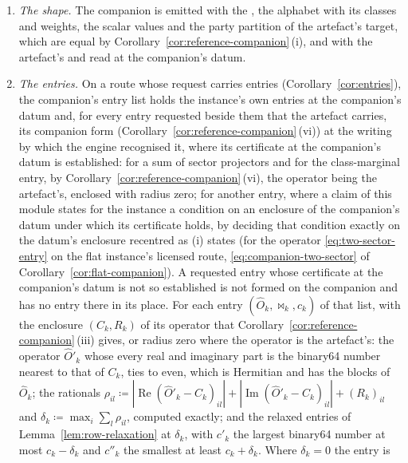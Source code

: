 \begin{requirement}
\begin{enumerate}[label=(\roman*),leftmargin=2.4em]
  emits the centres, entries of $\mathbb{Q}(i)$, and the radii, rationals,
  entry by entry, so that an entry the reference knows exactly is emitted
  exactly, with radius zero.
\item \emph{The shape.} The companion is emitted with the , the
  alphabet with its classes and weights, the scalar values and the party
  partition of the artefact's target, which are equal by
  Corollary~\ref{cor:reference-companion}\,(i), and with the artefact's
   and  read at the companion's datum.
\item \emph{The entries.} On a route whose request carries entries
  (Corollary~\ref{cor:entries}), the companion's entry list holds the
  instance's own entries at the companion's datum and, for every entry
  requested beside them that the artefact carries, its companion form
  (Corollary~\ref{cor:reference-companion}\,(vi)) at the writing by which
  the engine recognised it, where its certificate at the companion's datum
  is established: for a sum of sector projectors and for the class-marginal
  entry, by Corollary~\ref{cor:reference-companion}\,(vi), the operator
  being the artefact's, enclosed with radius zero; for another entry, where
  a claim of this module states for the instance a condition on an
  enclosure of the companion's datum under which its certificate holds,
  by deciding that condition exactly on the datum's enclosure recentred as
  (i) states (for the operator \eqref{eq:two-sector-entry} on the flat instance's
  licensed route, \eqref{eq:companion-two-sector} of
  Corollary~\ref{cor:flat-companion}). A requested entry whose certificate
  at the companion's datum is not so established is not formed on the
  companion and has no entry there in its place. For each entry
  $(\hat O_k,\bowtie_k,c_k)$ of that list, with the enclosure $(C_k,R_k)$
  of its operator that Corollary~\ref{cor:reference-companion}\,(iii)
  gives, or radius zero where the operator is the artefact's: the operator
  $\hat O'_k$ whose every real and imaginary part is the binary64 number
  nearest to that of $C_k$, ties to even, which is Hermitian and has the
  blocks of $\hat O_k$; the rationals
  $\rho_{il}\coloneqq|\operatorname{Re}(\hat O'_k-C_k)_{il}|
  +|\operatorname{Im}(\hat O'_k-C_k)_{il}|+(R_k)_{il}$ and
  $\delta_k\coloneqq\max_i\sum_l\rho_{il}$, computed exactly; and the
  relaxed entries of Lemma~\ref{lem:row-relaxation} at $\delta_k$, with
  $c'_k$ the largest binary64 number at most $c_k-\delta_k$ and $c''_k$ the
  smallest at least $c_k+\delta_k$. Where $\delta_k=0$ the entry is

\end{enumerate}
\end{requirement}
